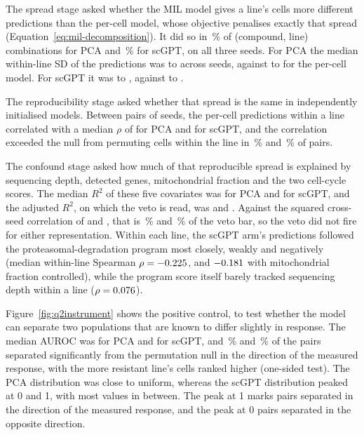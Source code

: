 The spread stage asked whether the MIL model gives a line's cells more different predictions than the
per-cell model, whose objective penalises exactly that spread (Equation~\ref{eq:mil-decomposition}).
It did so in \QSpreadPca\,\% of (compound, line) combinations for PCA and \QSpreadScgpt\,\% for scGPT, on all three seeds. For
PCA the median within-line SD of the predictions was \QSdMilPcaLo{} to \QSdMilPcaHi{} across seeds,
against \QSdCellPcaLo{} to \QSdCellPcaHi{} for the per-cell model. For scGPT it was \QSdMilScgptLo{} to
\QSdMilScgptHi{}, against \QSdCellScgptLo{} to \QSdCellScgptHi{}.

The reproducibility stage asked whether that spread is the same in independently initialised models.
Between pairs of seeds, the per-cell predictions within a line correlated with a median $\rho$ of
\QSeedRhoPca{} for PCA and \QSeedRhoScgpt{} for scGPT, and the correlation exceeded the null from
permuting cells within the line in \QSeedSigPca\,\% and \QSeedSigScgpt\,\% of pairs.

The confound stage asked how much of that reproducible spread is explained by sequencing depth,
detected genes, mitochondrial fraction and the two cell-cycle scores. The median $R^2$ of these five
covariates was \QConfRawPca{} for PCA and \QConfRawScgpt{} for scGPT, and the adjusted $R^2$, on which the
veto is read, was \QConfPca{} and \QConfScgpt{}. Against the squared cross-seed correlation of
\QReprPca{} and \QReprScgpt{}, that is \QBarPca\,\% and \QBarScgpt\,\% of the veto bar, so the veto did not
fire for either representation. Within each line, the scGPT arm's predictions followed the
proteasomal-degradation program most closely, weakly and negatively (median within-line Spearman
$\rho = -0.225$, and $-0.181$ with mitochondrial fraction controlled), while
the program score itself barely tracked sequencing depth within a line ($\rho = 0.076$).

Figure~\ref{fig:q2instrument} shows the positive control, to test whether the model can separate
two populations that are known to differ slightly in response. The median AUROC was \QAurocPca{} for PCA and
\QAurocScgpt{} for scGPT, and \QAurocSigPca\,\% and \QAurocSigScgpt\,\% of the pairs separated
significantly from the permutation null in the direction of the measured response, with the more
resistant line's cells ranked higher (one-sided test). The PCA distribution was close to uniform, whereas the scGPT distribution peaked at 0
and 1, with most values in between. The peak at 1 marks pairs separated in the direction of the
measured response, and the peak at 0 pairs separated in the opposite direction.

